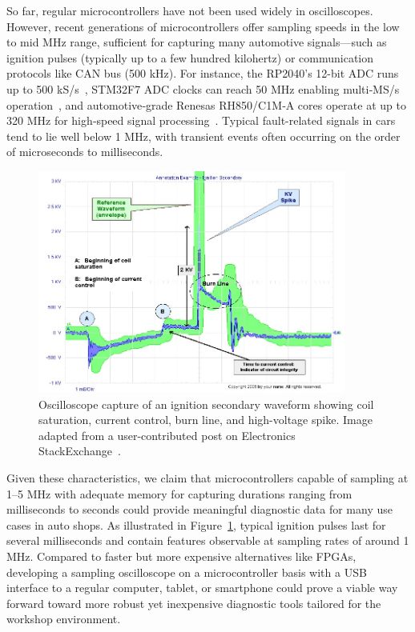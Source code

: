 \documentclass[conference,a4paper]{IEEEtran}
\begin{document}
So far, regular microcontrollers have not been used widely in oscilloscopes. 
However, recent generations of microcontrollers offer sampling speeds in the low to mid MHz range, 
sufficient for capturing many automotive signals—such as ignition pulses (typically up to a few hundred kilohertz) or communication protocols like CAN bus (500 kHz). 
For instance, the RP2040’s 12-bit ADC runs up to 500 kS/s~\cite{rp2040ds}, STM32F7 ADC clocks can reach 50 MHz enabling multi‑MS/s operation~\cite{stm32f7ds}, 
and automotive‑grade Renesas RH850/C1M‑A cores operate at up to 320 MHz for high‑speed signal processing~\cite{rh850ds}. 
Typical fault-related signals in cars tend to lie well below 1 MHz, with transient events often occurring on the order of microseconds to milliseconds.

\begin{figure}[h]
  \centering
  \includegraphics[width=0.9\textwidth]{figures/ignition_pulse.jpeg}
  \caption{Oscilloscope capture of an ignition secondary waveform showing coil saturation, current control, burn line, and high-voltage spike. 
  Image adapted from a user-contributed post on Electronics StackExchange~\cite{stackexchangeignition}.}
  \label{fig:ignition-scope}
\end{figure}

Given these characteristics, we claim that microcontrollers capable of sampling at 1–5 MHz with adequate memory for capturing durations ranging from 
milliseconds to seconds could provide meaningful diagnostic data for many use cases in auto shops. 
As illustrated in Figure~\ref{fig:ignition-scope}, typical ignition pulses last for several milliseconds and contain features observable at sampling rates of around 1 MHz.
Compared to faster but more expensive alternatives like FPGAs, developing a sampling oscilloscope on a microcontroller basis with a USB interface to a regular computer, 
tablet, or smartphone could prove a viable way forward toward more robust yet inexpensive diagnostic tools tailored for the workshop environment.
\end{document}
